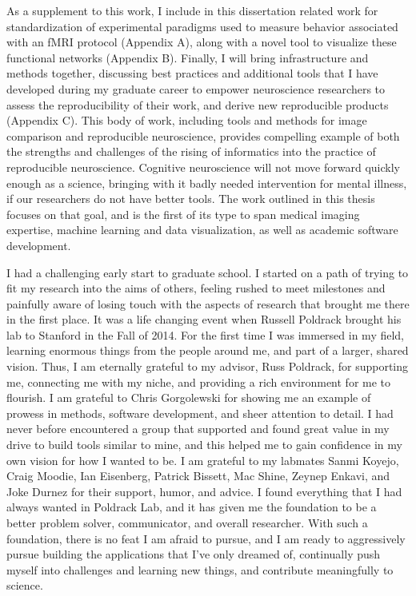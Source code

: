 \documentclass{report}
\begin{document}
As a supplement to this work, I include in this dissertation related work for standardization of experimental paradigms used to measure behavior associated with an fMRI protocol (Appendix A), along with a novel tool to visualize these functional networks (Appendix B). Finally, I will bring infrastructure and methods together, discussing best practices and additional tools that I have developed during my
graduate career to empower neuroscience researchers to assess the
reproducibility of their work, and derive new reproducible products (Appendix C). This body of work, including tools and methods for image comparison and reproducible neuroscience, provides compelling example of both the strengths and challenges of
the rising of informatics into the practice of reproducible neuroscience. Cognitive neuroscience will not move forward quickly enough as a science, bringing
with it badly needed intervention for mental illness, if our researchers
do not have better tools. The work outlined in this thesis focuses on
that goal, and is the first of its type to span medical imaging
expertise, machine learning and data visualization, as well as academic
software development.

I had a challenging early start to graduate school. I started on a path
of trying to fit my research into the aims of others, feeling rushed to
meet milestones and painfully aware of losing touch with the aspects of
research that brought me there in the first place. It was a life
changing event when Russell Poldrack brought his lab to Stanford in the
Fall of 2014. For the first time I was immersed in my field, learning
enormous things from the people around me, and part of a larger, shared
vision. Thus, I am eternally grateful to my advisor, Russ Poldrack, for
supporting me, connecting me with my niche, and providing a rich
environment for me to flourish. I am grateful to Chris Gorgolewski for
showing me an example of prowess in methods, software development, and
sheer attention to detail. I had never before encountered a group that
supported and found great value in my drive to build tools similar to
mine, and this helped me to gain confidence in my own vision for how I
wanted to be. I am grateful to my labmates Sanmi Koyejo, Craig Moodie,
Ian Eisenberg, Patrick Bissett, Mac Shine, Zeynep Enkavi, and Joke
Durnez for their support, humor, and advice. I found everything that I
had always wanted in Poldrack Lab, and it has given me the foundation to
be a better problem solver, communicator, and overall researcher. With
such a foundation, there is no feat I am afraid to pursue, and I am
ready to aggressively pursue building the applications that I've only
dreamed of, continually push myself into challenges and learning new
things, and contribute meaningfully to science.
\end{document}
